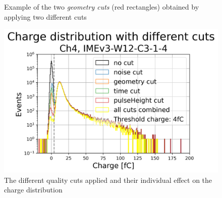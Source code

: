 \begin{figure}[!ht]
    \centering
    \hfill
    \centering
    \caption{Example of the two \textit{geometry cuts} (red rectangles) obtained by applying two different cuts}
    \label{fig:geometry_cut_comparison}
\end{figure}

\begin{figure}[!ht]
    \centering
    \includegraphics[width=0.7\linewidth]{Images/appendix/Charge_distribution_different_cuts_batch_401_S1_DUTs_3.png}
    \caption{The different quality cuts applied and their individual effect on the charge distribution}
    \label{fig:charge_plot_all_cuts}
\end{figure}